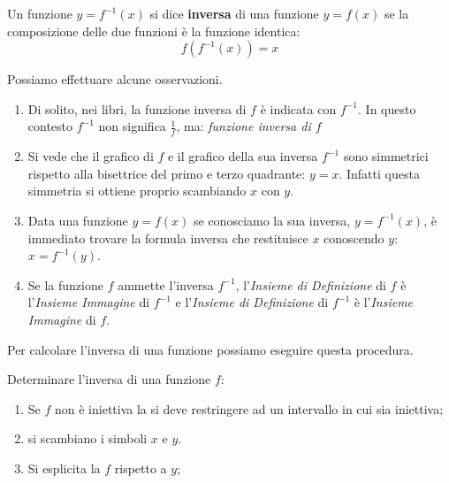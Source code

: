 
\begin{center}
\end{center}

\begin{definizione}
Un funzione \(y=f^{-1}(x)\) si dice \textbf{inversa} di una funzione \(y=f(x)\) 
se la composizione delle due funzioni è la funzione identica:
\[f(f^{-1}(x))=x\]
\end{definizione}

Possiamo effettuare alcune osservazioni. 
\begin{enumerate} [nosep]
\item
Di solito, nei libri, la funzione inversa di \(f\) è indicata con 
\(f^{-1}\). 
In questo contesto \(f^{-1}\)  non significa \(\frac{1}{f}\), ma: \quad
\emph{funzione inversa di \(f\)}
\item 
Si vede che il grafico di \(f\) e il grafico 
della sua inversa \(f^{-1}\) sono simmetrici rispetto alla bisettrice del 
primo e terzo quadrante: \(y=x\). Infatti questa simmetria si ottiene 
proprio scambiando \(x\) con \(y\). 
\item 
Data una funzione \(y = f(x)\) se conosciamo la sua inversa, 
\(y = f^{-1}(x)\), è immediato trovare la formula inversa che restituisce 
\(x\) conoscendo \(y\): \(x = f^{-1}(y)\).
\item 
Se la funzione \(f\) ammette l'inversa \(f^{-1}\), 
l'\emph{Insieme di Definizione} di \(f\) è l'\emph{Insieme Immagine} 
di \(f^{-1}\) e 
l'\emph{Insieme di Definizione} di \(f^{-1}\) è l'\emph{Insieme Immagine} 
di \(f\). 
\end{enumerate}

Per calcolare l'inversa di una funzione possiamo eseguire questa procedura.
\begin{procedura}
Determinare l'inversa di una funzione \(f\):
\begin{enumerate} [nosep]
\item Se \(f\) non è iniettiva la si deve restringere ad un intervallo in 
cui sia iniettiva;
\item si scambiano i simboli \(x\) e \(y\).
\item Si esplicita la \(f\) rispetto a \(y\);
\end{enumerate}
\end{procedura}

